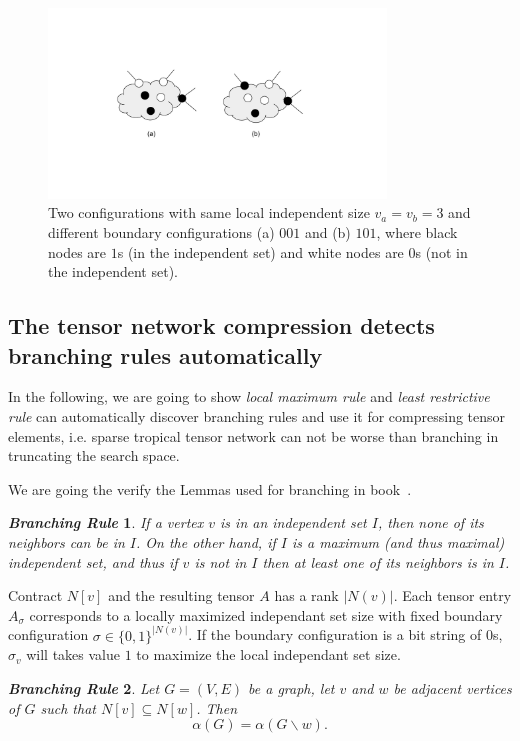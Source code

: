 \documentclass{article}
\newcommand{\<}{\langle}
\renewcommand{\>}{\rangle}
\renewcommand{\cite}[1]{{\citep{#1}}}
\newtheorem{theorem}{\textit{Branching Rule}}
\theoremstyle{definition}\newtheorem{definition}{\textit{Definition}}
\begin{document}
\begin{figure}
    \centering
    \includegraphics[width=0.8\textwidth, trim={5cm 4cm 5cm 4cm}, clip]{compressionrule.pdf}
    \caption{Two configurations with same local independent size $v_a = v_b = 3$ and different boundary configurations (a) ${001}$ and (b) ${101}$, where black nodes are $1$s (in the independent set) and white nodes are $0$s (not in the independent set).}\label{fig:compressrule}
\end{figure}

\subsection{The tensor network compression detects branching rules automatically}
In the following, we are going to show \textit{local maximum rule} and \textit{least restrictive rule} can automatically discover branching rules and use it for compressing tensor elements,
i.e. sparse tropical tensor network can not be worse than branching in truncating the search space.

We are going the verify the Lemmas used for branching in book~\cite{Fomin2013}.
\begin{theorem}\label{rule:one} %
  If a vertex $v$ is in an independent set $I$, then none of its neighbors can be in $I$.
On the other hand, if $I$ is a maximum (and thus maximal) independent set,
and thus if $v$ is not in $I$ then at least one of its neighbors is in $I$.
\end{theorem}

Contract $N[v]$ and the resulting tensor $A$ has a rank $|N(v)|$. Each tensor entry $A_{\sigma}$ corresponds to a locally maximized independant set size with fixed boundary configuration $\sigma \in \{0, 1\}^{|N(v)|}$.
If the boundary configuration is a bit string of 0s, $\sigma_v$ will takes value $1$ to maximize the local independant set size.

\begin{theorem} %
Let $G=(V,E)$ be a graph, let $v$ and $w$ be adjacent vertices of $G$ such that $N[v] \subseteq N[w]$. Then
\begin{equation}
\alpha(G)=\alpha(G\backslash w).
\end{equation}
\end{theorem}
\end{document}
